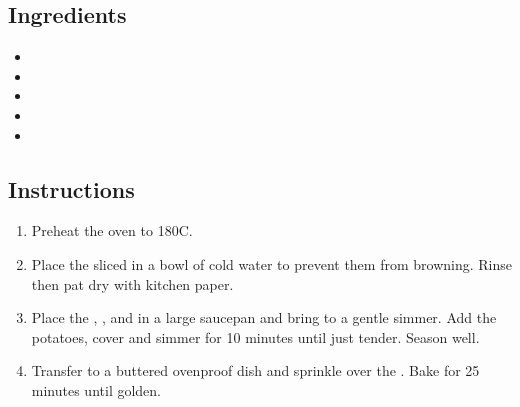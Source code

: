 \documentclass[12pt]{article}
\begin{document}
\recipetitle

\subsection*{Ingredients}

\begin{itemize}[nolistsep]
    \item {}
    \item {}
    \item {}
    \item {}
    \item {}
\end{itemize}

\subsection*{Instructions}

\begin{enumerate}
    \item Preheat the oven to 180{\degrees}C.
    \item Place the sliced  in a bowl of cold water to prevent them from browning. Rinse then pat dry with kitchen paper.
    \item Place the , , and  in a large saucepan and bring to a gentle simmer. Add the potatoes, cover and simmer for 10 minutes until just tender. Season well.
    \item Transfer to a buttered ovenproof dish and sprinkle over the . Bake for 25 minutes until golden.
\end{enumerate}
\end{document}
